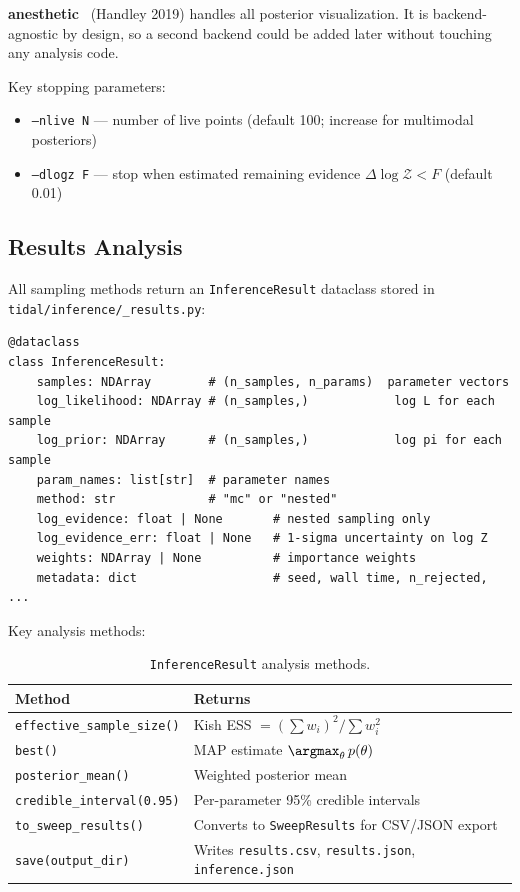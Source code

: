 \textbf{anesthetic}~\cite{handley2019anesthetic} (Handley 2019) handles all
posterior visualization.  It is backend-agnostic by design, so a second
backend could be added later without touching any analysis code.

Key stopping parameters:
\begin{itemize}
  \item \texttt{--nlive N} --- number of live points (default 100; increase for multimodal posteriors)
  \item \texttt{--dlogz F} --- stop when estimated remaining evidence $\Delta\log\mathcal{Z} < F$ (default 0.01)
\end{itemize}

\subsection{Results Analysis}
\label{sec:inference-results}

All sampling methods return an \texttt{InferenceResult} dataclass stored in
\texttt{tidal/inference/\_results.py}:

\begin{lstlisting}[style=python]
@dataclass
class InferenceResult:
    samples: NDArray        # (n_samples, n_params)  parameter vectors
    log_likelihood: NDArray # (n_samples,)            log L for each sample
    log_prior: NDArray      # (n_samples,)            log pi for each sample
    param_names: list[str]  # parameter names
    method: str             # "mc" or "nested"
    log_evidence: float | None       # nested sampling only
    log_evidence_err: float | None   # 1-sigma uncertainty on log Z
    weights: NDArray | None          # importance weights
    metadata: dict                   # seed, wall time, n_rejected, ...
\end{lstlisting}

Key analysis methods:

\begin{table}[htbp]
\centering
\caption{\texttt{InferenceResult} analysis methods.}
\label{tab:inference-methods}
\begin{tabular}{@{}ll@{}}
\toprule
Method & Returns \\
\midrule
\texttt{effective\_sample\_size()} & Kish ESS $= (\sum w_i)^2 / \sum w_i^2$ \\
\texttt{best()}                    & MAP estimate $\argmax_\theta\, p(\theta)$ \\
\texttt{posterior\_mean()}         & Weighted posterior mean \\
\texttt{credible\_interval(0.95)}  & Per-parameter 95\% credible intervals \\
\texttt{to\_sweep\_results()}      & Converts to \texttt{SweepResults} for CSV/JSON export \\
\texttt{save(output\_dir)}         & Writes \texttt{results.csv}, \texttt{results.json}, \texttt{inference.json} \\
\bottomrule
\end{tabular}
\end{table}


